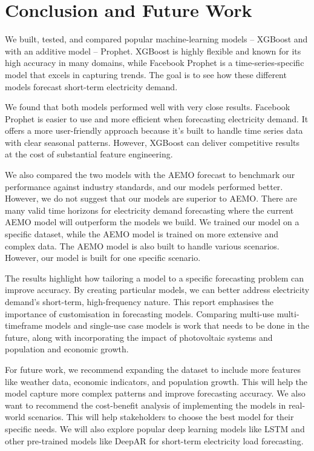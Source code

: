 \documentclass[mstat,12pt]{unswthesis}
\begin{document}
\chapter{Conclusion and Future Work}\label{conclusion-and-future-work}

We built, tested, and compared popular machine-learning models --
XGBoost and with an additive model -- Prophet. XGBoost is highly
flexible and known for its high accuracy in many domains, while Facebook
Prophet is a time-series-specific model that excels in capturing trends.
The goal is to see how these different models forecast short-term
electricity demand.

We found that both models performed well with very close results.
Facebook Prophet is easier to use and more efficient when forecasting
electricity demand. It offers a more user-friendly approach because it's
built to handle time series data with clear seasonal patterns. However,
XGBoost can deliver competitive results at the cost of substantial
feature engineering.

We also compared the two models with the AEMO forecast to benchmark our
performance against industry standards, and our models performed better.
However, we do not suggest that our models are superior to AEMO. There
are many valid time horizons for electricity demand forecasting where
the current AEMO model will outperform the models we build. We trained
our model on a specific dataset, while the AEMO model is trained on more
extensive and complex data. The AEMO model is also built to handle
various scenarios. However, our model is built for one specific
scenario.

The results highlight how tailoring a model to a specific forecasting
problem can improve accuracy. By creating particular models, we can
better address electricity demand's short-term, high-frequency nature.
This report emphasises the importance of customisation in forecasting
models. Comparing multi-use multi-timeframe models and single-use case
models is work that needs to be done in the future, along with
incorporating the impact of photovoltaic systems and population and
economic growth.

For future work, we recommend expanding the dataset to include more
features like weather data, economic indicators, and population growth.
This will help the model capture more complex patterns and improve
forecasting accuracy. We also want to recommend the cost-benefit
analysis of implementing the models in real-world scenarios. This will
help stakeholders to choose the best model for their specific needs. We
will also explore popular deep learning models like LSTM and other
pre-trained models like DeepAR for short-term electricity load
forecasting.
\end{document}
